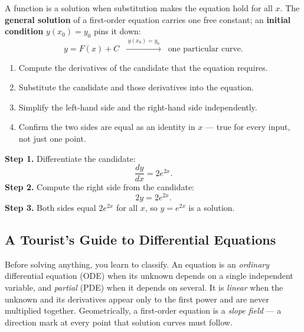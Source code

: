 \documentclass[11pt]{article}
\begin{document}
\begin{formulabox}
A function is a solution when substitution makes the equation hold for all $x$.
The \textbf{general solution} of a first-order equation carries one free
constant; an \textbf{initial condition} $y(x_0) = y_0$ pins it down:
\[
    y = F(x) + C
    \;\;\xrightarrow{\;y(x_0)=y_0\;}\;\;
    \text{one particular curve.}
\]
\end{formulabox}

\begin{methodbox}
\begin{enumerate}[leftmargin=1.6em, itemsep=2pt]
    \item Compute the derivatives of the candidate that the equation requires.
    \item Substitute the candidate and those derivatives into the equation.
    \item Simplify the left-hand side and the right-hand side independently.
    \item Confirm the two sides are equal as an identity in $x$ --- true for
          every input, not just one point.
\end{enumerate}
\end{methodbox}

\begin{examplebox}[Worked Example 0.2: Verify $y = e^{2x}$ solves $\frac{dy}{dx} = 2y$]
\textbf{Step 1.} Differentiate the candidate:
\[ \frac{dy}{dx} = 2e^{2x}. \]
\textbf{Step 2.} Compute the right side from the candidate:
\[ 2y = 2e^{2x}. \]
\textbf{Step 3.} Both sides equal $2e^{2x}$ for all $x$, so $y = e^{2x}$ is a
solution.
\end{examplebox}

\subsection{A Tourist's Guide to Differential Equations}

Before solving anything, you learn to classify. An equation is an \emph{ordinary}
differential equation (ODE) when its unknown depends on a single independent
variable, and \emph{partial} (PDE) when it depends on several. It is
\emph{linear} when the unknown and its derivatives appear only to the first
power and are never multiplied together. Geometrically, a first-order equation
is a \emph{slope field} --- a direction mark at every point that solution curves
must follow.
\end{document}
